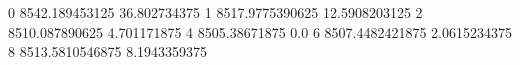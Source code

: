 0 8542.189453125 36.802734375
1 8517.9775390625 12.5908203125
2 8510.087890625 4.701171875
4 8505.38671875 0.0
6 8507.4482421875 2.0615234375
8 8513.5810546875 8.1943359375
